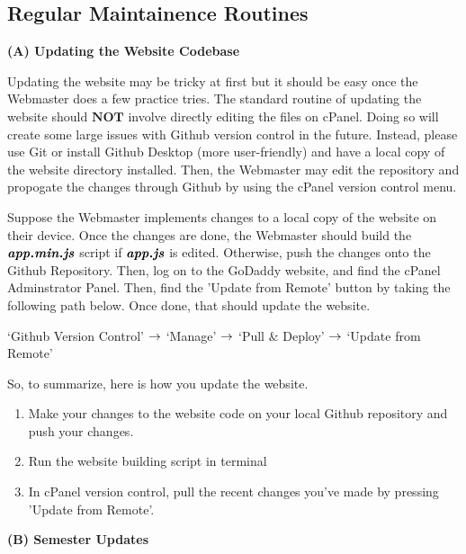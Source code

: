 \documentclass[a4paper]{article}
\begin{document}
\subsection{Regular Maintainence Routines}


\begin{center}
\textbf{(A) Updating the Website Codebase}
\end{center}

Updating the website may be tricky at first but it should be easy once the Webmaster does a few practice tries. The standard routine of updating the website should $\textbf{NOT}$ involve directly editing the files on cPanel. Doing so will create some large issues with Github version control in the future. Instead, please use Git or install Github Desktop (more user-friendly) and have a local copy of the website directory installed. Then, the Webmaster may edit the repository and propogate the changes through Github by using the cPanel version control menu.

Suppose the Webmaster implements changes to a local copy of the website on their device. Once the changes are done, the Webmaster should build the $\textbf{\textit{app.min.js}}$ script if $\textbf{\textit{app.js}}$ is edited. Otherwise, push the changes onto the Github Repository. Then, log on to the GoDaddy website, and find the cPanel Adminstrator Panel. Then, find the 'Update from Remote' button by taking the following path below. Once done, that should update the website.
\begin{center}
`Github Version Control' $\rightarrow$ `Manage' $\rightarrow$ `Pull $\&$ Deploy' $\rightarrow$ `Update from Remote'
\end{center}

\noindent So, to summarize, here is how you update the website.

\begin{enumerate}
  \item Make your changes to the website code on your local Github repository and push your changes.
  \item Run the website building script in terminal
  \item In cPanel version control, pull the recent changes you've made by pressing 'Update from Remote'.
\end{enumerate}


\begin{center}
\textbf{(B) Semester Updates}
\end{center}
\end{document}
